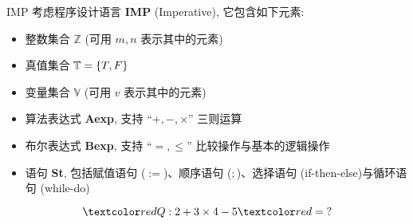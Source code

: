 
\begin{frame}{}
  \begin{exampleblock}{IMP}
    考虑程序设计语言 {\bf IMP} (Imperative), 它包含如下元素:

    \begin{itemize}
      \item 整数集合 $\mathbb{Z}$ (可用 $m,n$ 表示其中的元素)
      \item 真值集合 $\mathbb{T} = \{T, F\}$
      \item 变量集合 $\mathbb{V}$ (可用 $v$ 表示其中的元素)
      \item 算法表达式 {\bf Aexp}, 支持 ``$+, -, \times$'' 三则运算
      \item 布尔表达式 {\bf Bexp}, 支持 ``$=, \le$'' 比较操作与基本的逻辑操作
      \item 语句 {\bf St}, 包括赋值语句 ($:=$)、顺序语句 ($;$)、选择语句 (if-then-else)与循环语句 (while-do)
    \end{itemize}

    \begin{center}
    \end{center}
  \end{exampleblock}
\end{frame}

\begin{frame}{}

  \pause
  \[
    \red{Q:}\; 2 + 3 \times 4 - 5 \red{\;=\;?}
  \]
\end{frame}
